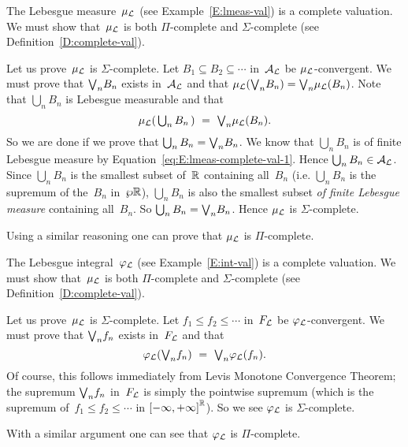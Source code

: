 \documentclass[main.tex]{subfiles}
\begin{document}
\begin{ex}
\label{E:lmeas-complete-val}
The Lebesgue measure~$\mu_{\mathcal{L}}$
(see Example~\ref{E:lmeas-val})
is a complete valuation.
We must show that~$\mu_{\mathcal{L}}$ is
both $\Pi$-complete and $\Sigma$-complete
(see Definition~\ref{D:complete-val}).

Let us prove~$\mu_{\mathcal{L}}$ is $\Sigma$-complete.
Let $B_1 \subseteq B_2 \subseteq \dotsb$ in~$\mathcal{A}_{\mathcal{L}}$
be $\mu_{\mathcal{L}}$-convergent.
We must prove that $\textstyle{\bigvee}_n B_n$ exists in~$\mathcal{A}_{\mathcal{L}}$
and that 
$\mu_{\mathcal{L}}(\textstyle{\bigvee}_n B_n) = \textstyle{\bigvee}_n \mu_{\mathcal{L}}(B_n)$.
Note that $\bigcup_n B_n$
is Lebesgue measurable and that
\begin{equation}
\label{eq:E:lmeas-complete-val-1}
\textstyle
\mu_{\mathcal{L}}(\,\bigcup_n B_n\,) \ =\  \textstyle{\bigvee}_n \mu_{\mathcal{L}}(B_n).
\end{equation}
So we are done if we prove that $\bigcup_n B_n = \textstyle{\bigvee}_n B_n$.
We know that $\bigcup_n B_n$ is of
finite Lebesgue measure
by Equation~\eqref{eq:E:lmeas-complete-val-1}.
Hence $\bigcup_n B_n \in \mathcal{A}_{\mathcal{L}}$.
Since $\bigcup_n B_n$ is the smallest subset of~$\mathbb{R}$
containing all~$B_n$
(i.e. $\bigcup_n B_n$ is the supremum of the~$B_n$ in~$\wp \mathbb{R}$),
$\bigcup_n B_n$ is also the smallest
subset \emph{of finite Lebesgue measure} containing all~$B_n$.
So
 $\bigcup_n B_n = \textstyle{\bigvee}_n B_n$.
Hence $\mu_{\mathcal{L}}$ is $\Sigma$-complete.

Using a similar reasoning one can prove that $\mu_{\mathcal{L}}$
is $\Pi$-complete.
\end{ex}
%
%
\begin{ex}
\label{E:int-complete-val}
The Lebesgue integral~$\varphi_{\mathcal{L}}$
(see Example~\ref{E:int-val})
is a complete valuation.
We must show that~$\mu_{\mathcal{L}}$ is
both $\Pi$-complete and $\Sigma$-complete
(see Definition~\ref{D:complete-val}).

Let us prove~$\mu_{\mathcal{L}}$ is $\Sigma$-complete.
Let $f_1\leq f_2 \leq\dotsb$ in~$F_{\mathcal{L}}$
be $\varphi_{\mathcal{L}}$-convergent.
We must prove that $\textstyle{\bigvee}_n f_n$ exists in~$F_{\mathcal{L}}$
and that 
\begin{equation*}
\varphi_{\mathcal{L}}(\textstyle{\bigvee}_n f_n) \ =\  \textstyle{\bigvee}_n \varphi_{\mathcal{L}}(f_n).
\end{equation*}
Of course,
this follows immediately from
Levis Monotone Convergence Theorem;
the supremum $\textstyle{\bigvee}_n f_n$ in~$F_{\mathcal{L}}$ is simply
the pointwise supremum
(which is the supremum of~$f_1\leq f_2 \leq\dotsb$ in ${[-\infty,+\infty]}^{\mathbb{R}}$).
So we see $\varphi_{\mathcal{L}}$ is $\Sigma$-complete.

With a similar argument one can see that $\varphi_{\mathcal{L}}$ is $\Pi$-complete.
\end{ex}
%
\end{document}
